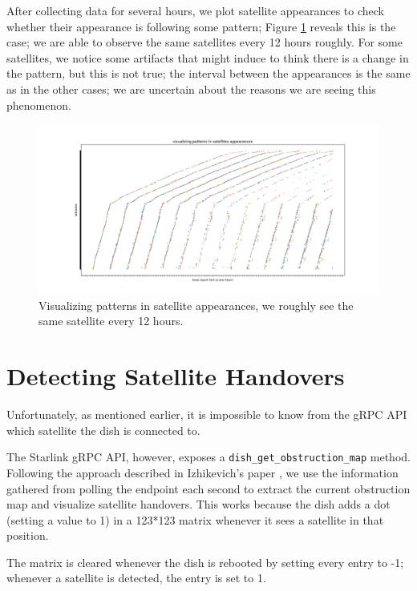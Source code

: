\documentclass[IN,11pt,twoside,openright,idp,english]{tumthesis}
\begin{document}
After collecting data for several hours, we plot satellite appearances to check whether their appearance is following some pattern; Figure \ref{fig:vis-sat-pat} reveals this is the case; we are able to observe the same satellites every 12 hours roughly. For some satellites, we notice some artifacts that might induce to think there is a change in the pattern, but this is not true; the interval between the appearances is the same as in the other cases; we are uncertain about the reasons we are seeing this phenomenon.

\begin{figure}
    \centering
    \includegraphics[width=1.0\columnwidth]{img/visualizing-how-long-satellites-are-visible-for.png}
    \caption{Visualizing patterns in satellite appearances, we roughly see the same satellite every 12 hours.}
    \label{fig:vis-sat-pat}
\end{figure}

\section{Detecting Satellite Handovers}

Unfortunately, as mentioned earlier, it is impossible to know from the gRPC API which satellite the dish is connected to.

The Starlink gRPC API, however, exposes a \texttt{dish\_get\_obstruction\_map} method. Following the approach described in Izhikevich's paper \cite{izhikevich2023democratizing}, we use the information gathered from polling the endpoint each second to extract the current obstruction map and visualize satellite handovers. This works because the dish adds a dot (setting a value to 1) in a 123*123 matrix whenever it sees a satellite in that position. 

The matrix is cleared whenever the dish is rebooted by setting every entry to -1; whenever a satellite is detected, the entry is set to 1. 
\end{document}
